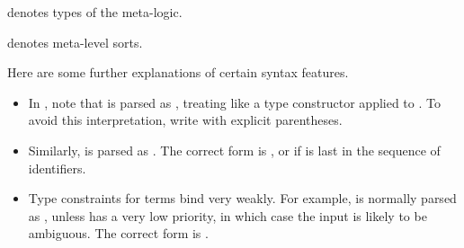 \begin{isabellebody}
\begin{isamarkuptext}
\begin{description}
  \item {}\hyperlink{syntax.inner.type}{\mbox{}} denotes types of the meta-logic.

  \item {}\hyperlink{syntax.inner.sort}{\mbox{}} denotes meta-level sorts.

  \end{description}

  Here are some further explanations of certain syntax features.

  \begin{itemize}

  \item In \hyperlink{syntax.inner.idts}{\mbox{}}, note that  is
  parsed as , treating  like a type
  constructor applied to .  To avoid this interpretation,
  write  with explicit parentheses.

  \item Similarly,  is parsed as .  The correct form is , or  if  is last in the
  sequence of identifiers.

  \item Type constraints for terms bind very weakly.  For example,
   is normally parsed as , unless \isa{{\isachardoublequote}{\isacharless}{\isachardoublequote}} has a very low priority, in which case the
  input is likely to be ambiguous.  The correct form is .


\end{itemize}
\end{isamarkuptext}
\end{isabellebody}
